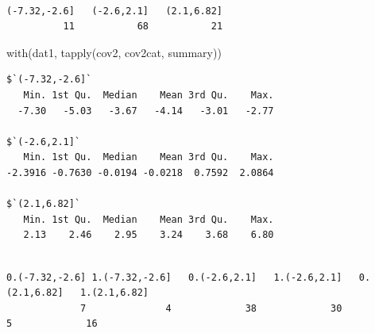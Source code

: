 \documentclass[
  12pt,
]{book}
\newenvironment{Shaded}{\begin{snugshade}}{\end{snugshade}}
\newcommand{\AttributeTok}[1]{\textcolor[rgb]{0.77,0.63,0.00}{#1}}
\newcommand{\DecValTok}[1]{\textcolor[rgb]{0.00,0.00,0.81}{#1}}
\newcommand{\DocumentationTok}[1]{\textcolor[rgb]{0.56,0.35,0.01}{\textbf{\textit{#1}}}}
\newcommand{\FunctionTok}[1]{\textcolor[rgb]{0.00,0.00,0.00}{#1}}
\newcommand{\NormalTok}[1]{#1}
\newcommand{\OtherTok}[1]{\textcolor[rgb]{0.56,0.35,0.01}{#1}}
\newcommand{\SpecialCharTok}[1]{\textcolor[rgb]{0.00,0.00,0.00}{#1}}
\theoremstyle{definition}
\theoremstyle{definition}
\theoremstyle{definition}
\theoremstyle{remark}
\begin{document}
\begin{verbatim}

(-7.32,-2.6]   (-2.6,2.1]   (2.1,6.82] 
          11           68           21 
\end{verbatim}

\begin{Shaded}
\begin{Highlighting}[]
\FunctionTok{with}\NormalTok{(dat1, }\FunctionTok{tapply}\NormalTok{(cov2, cov2cat, summary))}
\end{Highlighting}
\end{Shaded}

\begin{verbatim}
$`(-7.32,-2.6]`
   Min. 1st Qu.  Median    Mean 3rd Qu.    Max. 
  -7.30   -5.03   -3.67   -4.14   -3.01   -2.77 

$`(-2.6,2.1]`
   Min. 1st Qu.  Median    Mean 3rd Qu.    Max. 
-2.3916 -0.7630 -0.0194 -0.0218  0.7592  2.0864 

$`(2.1,6.82]`
   Min. 1st Qu.  Median    Mean 3rd Qu.    Max. 
   2.13    2.46    2.95    3.24    3.68    6.80 
\end{verbatim}

\begin{Shaded}
\end{Shaded}

\begin{verbatim}

0.(-7.32,-2.6] 1.(-7.32,-2.6]   0.(-2.6,2.1]   1.(-2.6,2.1]   0.(2.1,6.82]   1.(2.1,6.82] 
             7              4             38             30              5             16 
\end{verbatim}

\begin{Shaded}
\end{Shaded}
\end{document}
